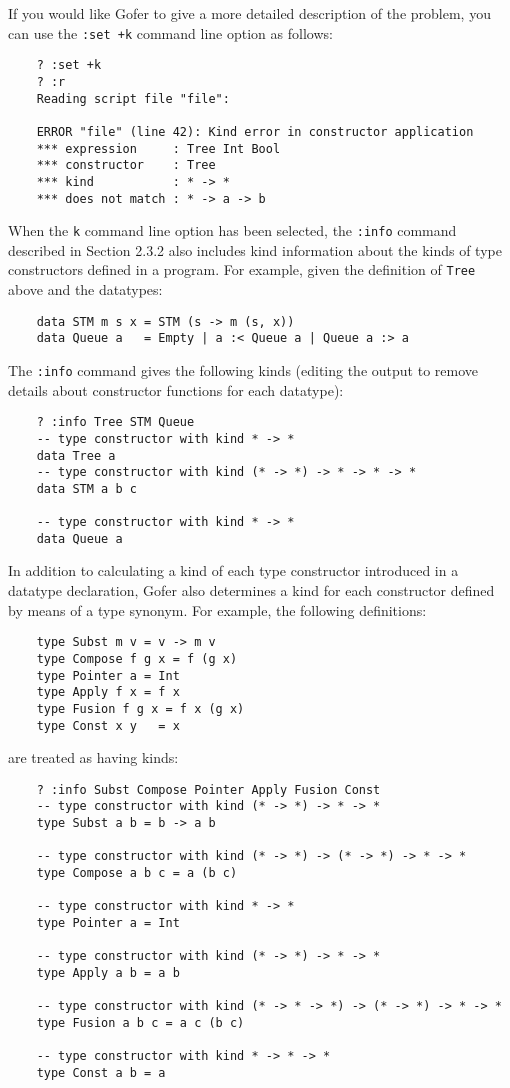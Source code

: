 If you would like Gofer to give a more detailed description of the
problem, you can use the \verb":set +k" command line option as follows:
\begin{verbatim}
    ? :set +k
    ? :r
    Reading script file "file":
       
    ERROR "file" (line 42): Kind error in constructor application
    *** expression     : Tree Int Bool
    *** constructor    : Tree
    *** kind           : * -> *
    *** does not match : * -> a -> b
\end{verbatim}
When the \verb"k" command line option has been selected, the \verb":info" command
described in Section 2.3.2 also includes kind information about the
kinds of type constructors defined in a program.  For example, given
the definition of \verb"Tree" above and the datatypes:
\begin{verbatim}
    data STM m s x = STM (s -> m (s, x))
    data Queue a   = Empty | a :< Queue a | Queue a :> a
\end{verbatim}
The \verb":info" command gives the following kinds (editing the output to
remove details about constructor functions for each datatype):
\begin{verbatim}
    ? :info Tree STM Queue
    -- type constructor with kind * -> *
    data Tree a
    -- type constructor with kind (* -> *) -> * -> * -> *
    data STM a b c

    -- type constructor with kind * -> *
    data Queue a
\end{verbatim}
In addition to calculating a kind of each type constructor introduced
in a datatype declaration, Gofer also determines a kind for each
constructor defined by means of a type synonym.  For example, the
following definitions:
\begin{verbatim}
    type Subst m v = v -> m v
    type Compose f g x = f (g x)
    type Pointer a = Int
    type Apply f x = f x
    type Fusion f g x = f x (g x)
    type Const x y   = x
\end{verbatim}
are treated as having kinds:
\begin{verbatim}
    ? :info Subst Compose Pointer Apply Fusion Const
    -- type constructor with kind (* -> *) -> * -> *
    type Subst a b = b -> a b

    -- type constructor with kind (* -> *) -> (* -> *) -> * -> *
    type Compose a b c = a (b c)

    -- type constructor with kind * -> *
    type Pointer a = Int

    -- type constructor with kind (* -> *) -> * -> *
    type Apply a b = a b

    -- type constructor with kind (* -> * -> *) -> (* -> *) -> * -> *
    type Fusion a b c = a c (b c)

    -- type constructor with kind * -> * -> *
    type Const a b = a
\end{verbatim}
